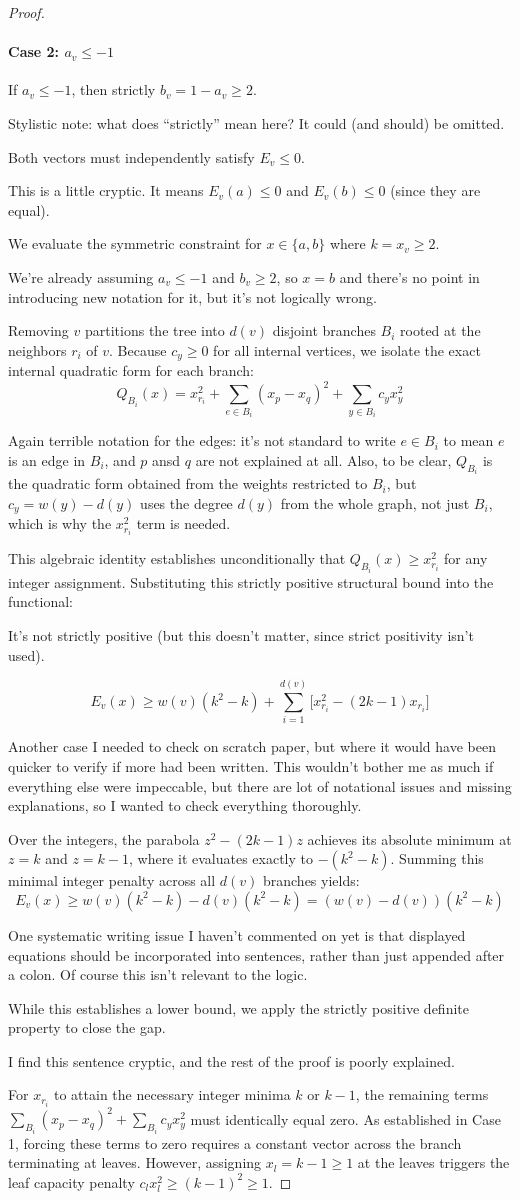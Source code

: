 \documentclass[12pt]{article}
\newcommand{\review}[1]{\begin{reviewbox}#1\end{reviewbox}}
\begin{document}
\begin{proof}
\paragraph{Case 2: $a_v \le -1$}
If $a_v \le -1$, then strictly $b_v = 1 - a_v \ge 2$. 
\review{Stylistic note: what does ``strictly'' mean here? It could (and should) be omitted.} 
Both vectors must independently satisfy $E_v \le 0$. 
\review{This is a little cryptic. It means $E_v (a) \le 0$ and $E_v(b) \le 0$ (since they are equal).}
We evaluate the symmetric constraint for $x \in \{a, b\}$ where $k = x_v \ge 2$. 
\review{We're already assuming $a_v \le -1$ and $b_v \ge 2$, so $x=b$ and there's no point in introducing new notation for it, but it's not logically wrong.}
Removing $v$ partitions the tree into $d(v)$ disjoint branches $B_i$ rooted at the neighbors $r_i$ of $v$. Because $c_y \ge 0$ for all internal vertices, we isolate the exact internal quadratic form for each branch:
\[
Q_{B_i}(x) = x_{r_i}^2 + \sum_{e \in B_i} (x_p - x_q)^2 + \sum_{y \in B_i} c_y x_y^2
\]
\review{Again terrible notation for the edges: it's not standard to write $e \in B_i$ to mean $e$ is an edge in $B_i$, and $p$ ansd $q$ are not explained at all. Also, to be clear, $Q_{B_i}$ is the quadratic form obtained from the weights restricted to $B_i$, but $c_y = w(y)-d(y)$ uses the degree $d(y)$ from the whole graph, not just $B_i$, which is why the $x_{r_i}^2$ term is needed.}
This algebraic identity establishes unconditionally that $Q_{B_i}(x) \ge x_{r_i}^2$ for any integer assignment. 
Substituting this strictly positive structural bound into the functional:
\review{It's not strictly positive (but this doesn't matter, since strict positivity isn't used).}
\[
E_v(x) \ge w(v)(k^2 - k) + \sum_{i=1}^{d(v)} \big[ x_{r_i}^2 - (2k-1)x_{r_i} \big]
\]
\review{Another case I needed to check on scratch paper, but where it would have been quicker to verify if more had been written. This wouldn't bother me as much if everything else were impeccable, but there are lot of notational issues and missing explanations, so I wanted to check everything thoroughly.}
Over the integers, the parabola $z^2 - (2k-1)z$ achieves its absolute minimum at $z = k$ and $z = k-1$, where it evaluates exactly to $-(k^2 - k)$. 
Summing this minimal integer penalty across all $d(v)$ branches yields:
\[
E_v(x) \ge w(v)(k^2 - k) - d(v)(k^2 - k) = (w(v) - d(v))(k^2 - k)
\]
\review{One systematic writing issue I haven't commented on yet is that displayed equations should be incorporated into sentences, rather than just appended after a colon. Of course this isn't relevant to the logic.}
While this establishes a lower bound, we apply the strictly positive definite property to close the gap. 
\review{I find this sentence cryptic, and the rest of the proof is poorly explained.}
For $x_{r_i}$ to attain the necessary integer minima $k$ or $k-1$, the remaining terms $\sum_{B_i} (x_p - x_q)^2 + \sum_{B_i} c_y x_y^2$ must identically equal zero. As established in Case 1, forcing these terms to zero requires a constant vector across the branch terminating at leaves. However, assigning $x_l = k-1 \ge 1$ at the leaves triggers the leaf capacity penalty $c_l x_l^2 \ge (k-1)^2 \ge 1$. 


\end{proof}
\end{document}
